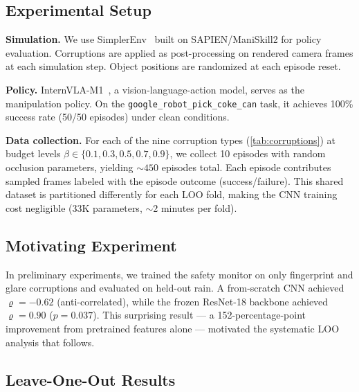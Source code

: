 \documentclass[letterpaper]{IEEEtran}
\renewcommand{\rho}{\varrho}
\begin{document}
\subsection{Experimental Setup}

\noindent\textbf{Simulation.}
We use SimplerEnv~\cite{simplerenv} built on SAPIEN/ManiSkill2 for policy evaluation.
Corruptions are applied as post-processing on rendered camera frames at each simulation step.
Object positions are randomized at each episode reset.

\noindent\textbf{Policy.}
InternVLA-M1~\cite{internvla}, a vision-language-action model, serves as the manipulation policy.
On the \texttt{google\_robot\_pick\_coke\_can} task, it achieves 100\% success rate (50/50 episodes) under clean conditions.

\noindent\textbf{Data collection.}
For each of the nine corruption types (\cref{tab:corruptions}) at budget levels $\beta \in \{0.1, 0.3, 0.5, 0.7, 0.9\}$, we collect 10 episodes with random occlusion parameters, yielding ${\sim}450$ episodes total.
Each episode contributes sampled frames labeled with the episode outcome (success/failure).
This shared dataset is partitioned differently for each LOO fold, making the CNN training cost negligible (33K parameters, ${\sim}$2 minutes per fold).

\subsection{Motivating Experiment}

In preliminary experiments, we trained the safety monitor on only fingerprint and glare corruptions and evaluated on held-out rain.
A from-scratch CNN achieved $\rho = -0.62$ (anti-correlated), while the frozen ResNet-18 backbone achieved $\rho = 0.90$ ($p = 0.037$).
This surprising result --- a 152-percentage-point improvement from pretrained features alone --- motivated the systematic LOO analysis that follows.

\subsection{Leave-One-Out Results}
\end{document}
